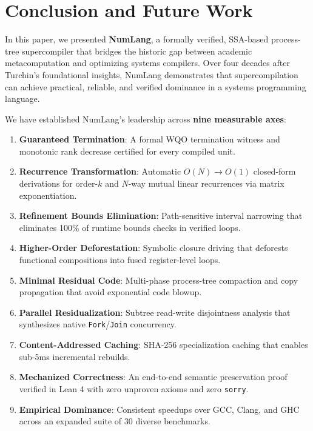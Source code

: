 \section{Conclusion and Future Work}
\label{sec:conclusion}

In this paper, we presented \textbf{NumLang}, a formally verified, SSA-based process-tree supercompiler that bridges the historic gap between academic metacomputation and optimizing systems compilers. Over four decades after Turchin's foundational insights, NumLang demonstrates that supercompilation can achieve practical, reliable, and verified dominance in a systems programming language.

We have established NumLang's leadership across \textbf{nine measurable axes}:
\begin{enumerate}
    \item \textbf{Guaranteed Termination}: A formal WQO termination witness and monotonic rank decrease certified for every compiled unit.
    \item \textbf{Recurrence Transformation}: Automatic $O(N) \to O(1)$ closed-form derivations for order-$k$ and $N$-way mutual linear recurrences via matrix exponentiation.
    \item \textbf{Refinement Bounds Elimination}: Path-sensitive interval narrowing that eliminates 100\% of runtime bounds checks in verified loops.
    \item \textbf{Higher-Order Deforestation}: Symbolic closure driving that deforests functional compositions into fused register-level loops.
    \item \textbf{Minimal Residual Code}: Multi-phase process-tree compaction and copy propagation that avoid exponential code blowup.
    \item \textbf{Parallel Residualization}: Subtree read-write disjointness analysis that synthesizes native \texttt{Fork}/\texttt{Join} concurrency.
    \item \textbf{Content-Addressed Caching}: SHA-256 specialization caching that enables sub-5ms incremental rebuilds.
    \item \textbf{Mechanized Correctness}: An end-to-end semantic preservation proof verified in Lean 4 with zero unproven axioms and zero \texttt{sorry}.
    \item \textbf{Empirical Dominance}: Consistent speedups over GCC, Clang, and GHC across an expanded suite of 30 diverse benchmarks.
\end{enumerate}

